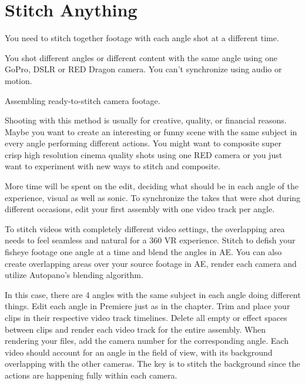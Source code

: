 \chapter{Stitch Anything}
\pagecolor{white}
\label{chap:49}
\begin{fullwidth}

\problem

{\large You need to stitch together footage with each angle shot at a different time. \par}

You shot different angles or different content with the same angle using one GoPro, DSLR or RED Dragon camera. You can’t synchronize using audio or motion. 

\solution

{\large Assembling ready-to-stitch camera footage. \par}

Shooting with this method is usually for creative, quality, or financial reasons. Maybe you want to create an interesting or funny scene with the same subject in every angle performing different actions. You might want to composite super crisp high resolution cinema quality shots using one RED camera or you just want to experiment with new ways to stitch and composite.

More time will be spent on the edit, deciding what should be in each angle of the experience, visual as well as sonic. To synchronize the takes that were shot during different occasions, edit your first assembly with one video track per angle. 


To stitch videos with completely different video settings, the overlapping area needs to feel seamless and natural for a 360 VR experience. Stitch to defish your fisheye footage one angle at a time and blend the angles in AE. You can also create overlapping areas over your source footage in AE, render each camera and utilize Autopano’s blending algorithm.
\clearpage
{}

In this case, there are 4 angles with the same subject in each angle doing different things. Edit each angle in Premiere just as in the \textbf{} chapter. Trim and place your clips in their respective video track timelines. Delete all empty or effect spaces between clips and render each video track for the entire assembly. When rendering your files, add the camera number for the corresponding angle. Each video should account for an angle in the field of view, with its background overlapping with the other cameras. The key is to stitch the background since the actions are happening fully within each camera. 


\clearpage
\end{fullwidth}